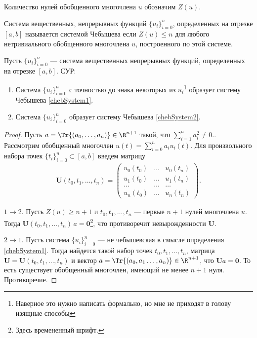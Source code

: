 Количество нулей обобщенного многочлена $u$ обозначим $Z(u)$.
\begin{dfn}[Аксиоматическое]
    \label{chebSystem2}
    Система вещественных, непрерывных функций $\{u_i\}_{i=0}^n$, определенных на отрезке $[a, b]$ называется системой Чебышева
    если $Z(u) \leqslant n$ для любого нетривиального обобщенного многочлена $u$, построенного по этой системе.
\end{dfn}



\begin{thm}
    \label{chebDefEqual}
    Пусть $\{u_i\}_{i=0}^n$ --- система вещественных непрерывных функций, определенных на отрезке $[a, b]$.
    СУР:
    \begin{enumerate}
        \item Система $\{u_i\}_{i=0}^n$ с точностью до знака некоторых из $u_i$\footnote{\color{blue} Наверное
            это нужно написать формально, но мне не приходят в голову изящные способы}  образует систему Чебышева \ref{chebSystem1}.
        \item Система $\{u_i\}_{i=0}^n$ образует систему Чебышева \ref{chebSystem2}.
    \end{enumerate}
\end{thm}
\begin{proof}
    Пусть $a = \Tr{(a_0, \ldots, a_n)} \in \R^{n + 1}$ такой, что $\sum_{i=1}^n a_i^2 \neq0$..
    Рассмотрим обобщенный многочлен $u(t) = \sum_{i=0}^n a_i u_i(t)$.
    Для произвольного набора точек $\{t_i\}_{i=0}^n \subset [a, b]$ введем матрицу
    \begin{gather*}
        \mathbf U(t_0, t_1, \ldots, t_n) =
        \begin{pmatrix}
            u_0(t_0) & \ldots & u_0(t_n) \\
            u_1(t_0) & \ldots & u_1(t_n) \\
            \ldots & \ldots & \ldots \\
            u_n(t_0) & \ldots & u_n(t_n)
        \end{pmatrix}.
    \end{gather*}

    $1 \rightarrow 2$.
        Пусть $Z(u) \geqslant n + 1$ и $t_0, t_1, \ldots, t_n$ --- первые $n + 1$ нулей многочлена $u$.
        Тогда $\mathbf U(t_0, t_1, \ldots, t_n) \, a = \mathbf 0$\footnote{\color{blue} Здесь времененный шрифт.},
        что противоречит невырожденности $\mathbf U$.

    $2 \rightarrow 1$.
        Пусть система $\{u_i\}_{i=0}^n$ --- не чебышевская в смысле определения \ref{chebSystem1}.
        Тогда найдется такой набор точек $t_0, t_1, \ldots, t_n$,
        матрица $\mathbf U = \mathbf U(t_0, t_1, \ldots, t_n)$ и
        вектор $a = \Tr{(a_0, a_1 \ldots, a_n)} \in \R^{n + 1}$, что $\mathbf U a = \mathbf 0$.
        То есть существует обобщенный многочлен, имеющий не менее $n + 1$ нуля. Противоречие.
\end{proof}
